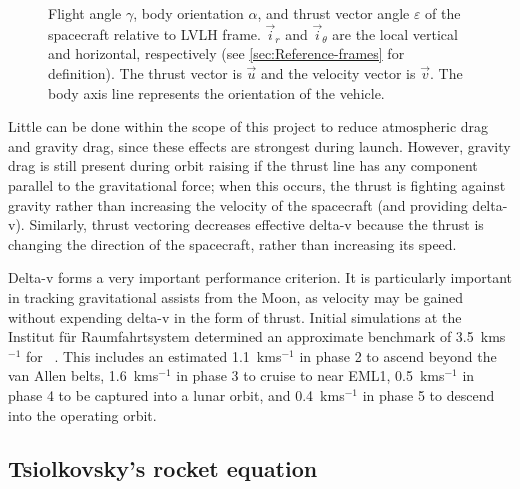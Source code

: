 \begin{figure}
\centering
\def\svgwidth{0.4\textwidth}

\caption{Flight angle $\gamma$, body orientation $\alpha$, and thrust vector angle $\varepsilon$ of the spacecraft relative to LVLH frame. $\vec{i}_r$ and $\vec{i}_\theta$ are the local vertical and horizontal, respectively (see \autoref{sec:Reference-frames} for definition). The thrust vector is $\vec{u}$ and the velocity vector is $\vec{v}$. The body axis line represents the orientation of the vehicle.} 
\label{fig:path-angles}
\end{figure}

Little can be done within the scope of this project to reduce atmospheric drag and gravity drag, since these effects are strongest during launch. However, gravity drag is still present during orbit raising if the thrust line has any component parallel to the gravitational force; when this occurs, the thrust is fighting against gravity rather than increasing the velocity of the spacecraft (and providing delta-v). Similarly, thrust vectoring decreases effective delta-v because the thrust is changing the direction of the spacecraft, rather than increasing its speed. 
 
Delta-v forms a very important performance criterion. It is particularly important in tracking gravitational assists from the Moon, as velocity may be gained without expending delta-v in the form of thrust. Initial simulations at the Institut f\"{u}r Raumfahrtsystem determined an approximate benchmark of 3.5~kms$^{-1}$ for \BW\ \parencite{Roeser2006}. This includes an estimated 1.1~kms$^{-1}$ in phase 2 to ascend beyond the van Allen belts, 1.6~kms$^{-1}$ in phase 3 to cruise to near EML1, 0.5~kms$^{-1}$ in phase 4 to be captured into a lunar orbit, and 0.4~kms$^{-1}$ in phase 5 to descend into the operating orbit.

\subsection{Tsiolkovsky's rocket equation} \label{sec:Tsiolkovsky}

